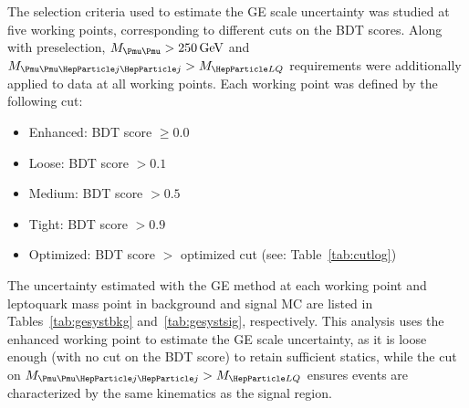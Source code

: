 The selection criteria used to estimate the GE scale uncertainty was studied at five working points, corresponding to different cuts on the BDT scores. Along with preselection, $\Muu > \SI{250}{\GeV}$ and $\Muujj > \MLQ$ requirements were additionally applied to data at all working points. Each working point was defined by the following cut:
\begin{itemize}
    \item Enhanced: BDT score $\geq 0.0$
    \item Loose: BDT score $> 0.1$
    \item Medium: BDT score $> 0.5$
    \item Tight: BDT score $> 0.9$
    \item Optimized: BDT score $>$ optimized cut (see: Table~\ref{tab:cutlog})
\end{itemize}
The uncertainty estimated with the GE method at each working point and leptoquark mass point in background and signal MC are listed in Tables~\ref{tab:gesystbkg} and~\ref{tab:gesystsig}, respectively. This analysis uses the enhanced working point to estimate the GE scale uncertainty, as it is loose enough (with no cut on the BDT score) to retain sufficient statics, while the cut on $\Muujj > \MLQ$ ensures events are characterized by the same kinematics as the signal region.

